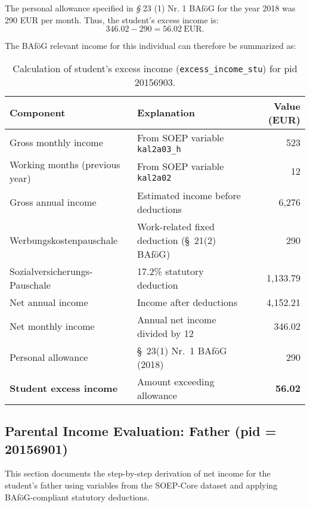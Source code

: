 The personal allowance specified in \textit{§} 23 (1) Nr. 1 BAföG for the year 2018 was 290 EUR per month. Thus, the student’s excess income is:
\[
346.02 - 290 = 56.02~\text{EUR}.
\]

The BAföG relevant income for this individual can therefore be summarized as:
\begin{table}[H]
\footnotesize
\centering
\begin{tabularx}{\textwidth}{lXr}
\toprule
\textbf{Component} & \textbf{Explanation} & \textbf{Value (EUR)} \\
\midrule
Gross monthly income & From SOEP variable \texttt{kal2a03\_h} & 523 \\
Working months (previous year) & From SOEP variable \texttt{kal2a02} & 12 \\
\midrule
Gross annual income & Estimated income before deductions & 6,276 \\
\midrule
Werbungskostenpauschale & Work-related fixed deduction (§~21(2) BAföG) & 290 \\
Sozialversicherungs-Pauschale & 17.2\% statutory deduction & 1,133.79 \\
\midrule
Net annual income & Income after deductions & 4,152.21 \\
Net monthly income & Annual net income divided by 12 & 346.02 \\
\midrule
Personal allowance & §~23(1) Nr.~1 BAföG (2018) & 290 \\
\midrule
\textbf{Student excess income} & Amount exceeding allowance & \textbf{56.02} \\
\bottomrule
\end{tabularx}
\caption{Calculation of student’s excess income (\texttt{excess\_income\_stu}) for pid 20156903.}
\label{table:bafoeg_excess_income_stu}
\end{table}



\subsection{Parental Income Evaluation: Father (pid = 20156901)}

This section documents the step-by-step derivation of net income for the student's father using variables from the SOEP-Core dataset and applying BAföG-compliant statutory deductions.


